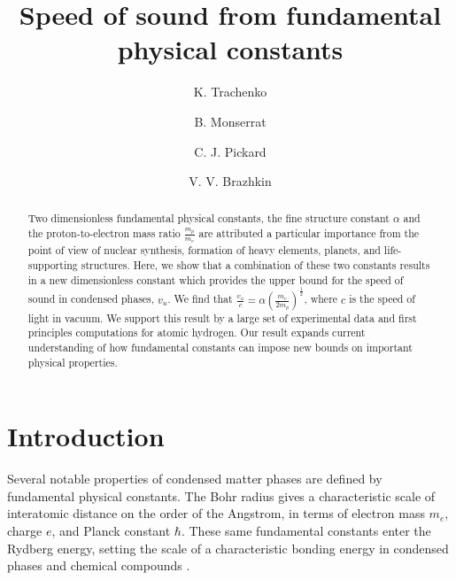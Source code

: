 \documentclass[aps,prl,groupedaddress,fleqn,twocolumn,10pt]{revtex4}
\begin{document}
\raggedbottom

\title{Speed of sound from fundamental physical constants}
\author{K. Trachenko}
\author{B. Monserrat}
\author{C. J. Pickard}
\author{V. V. Brazhkin}

\begin{abstract}
Two dimensionless fundamental physical constants, the fine structure constant $\alpha$ and the proton-to-electron mass ratio $\frac{m_p}{m_e}$ are attributed a particular importance from the point of view of nuclear synthesis, formation of heavy elements, planets, and life-supporting structures. Here, we show that a combination of these two constants results in a new dimensionless constant which provides the upper bound for the speed of sound in condensed phases, $v_u$. We find that $\frac{v_u}{c}=\alpha\left(\frac{m_e}{2m_p}\right)^{\frac{1}{2}}$, where $c$ is the speed of light in vacuum. We support this result by a large set of experimental data and first principles computations for atomic hydrogen. Our result expands current understanding of how fundamental constants can impose new bounds on important physical properties.
\end{abstract}

\maketitle

\section{Introduction}

Several notable properties of condensed matter phases are defined by fundamental physical constants. The Bohr radius gives a characteristic scale of interatomic distance on the order of the Angstrom, in terms of electron mass $m_e$, charge $e$, and Planck constant $\hbar$. These same fundamental constants enter the Rydberg energy, setting the scale of a characteristic bonding energy in condensed phases and chemical compounds \cite{ashcroft}.
\end{document}
